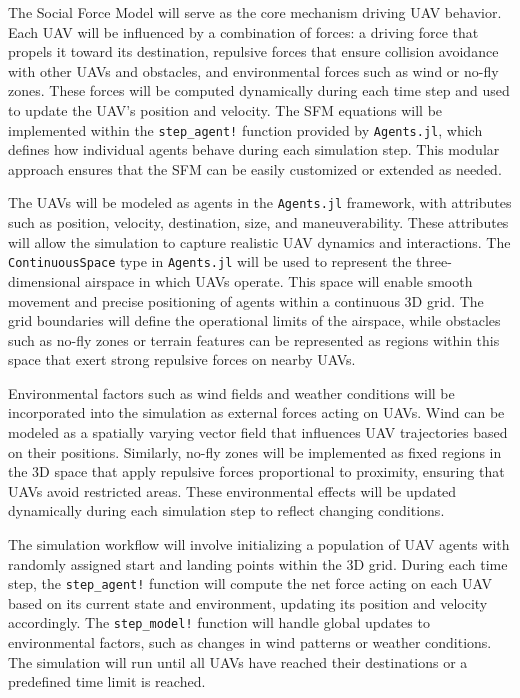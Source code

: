 \documentclass[letterpaper,11pt]{article}
\begin{document}
The Social Force Model will serve as the core mechanism driving UAV behavior. Each UAV will be influenced by a combination of forces: a driving force that propels it toward its destination, repulsive forces that ensure collision avoidance with other UAVs and obstacles, and environmental forces such as wind or no-fly zones. These forces will be computed dynamically during each time step and used to update the UAV's position and velocity. The SFM equations will be implemented within the \texttt{step\_agent!} function provided by \texttt{Agents.jl}, which defines how individual agents behave during each simulation step. This modular approach ensures that the SFM can be easily customized or extended as needed.

The UAVs will be modeled as agents in the \texttt{Agents.jl} framework, with attributes such as position, velocity, destination, size, and maneuverability. These attributes will allow the simulation to capture realistic UAV dynamics and interactions. The \texttt{ContinuousSpace} type in \texttt{Agents.jl} will be used to represent the three-dimensional airspace in which UAVs operate. This space will enable smooth movement and precise positioning of agents within a continuous 3D grid. The grid boundaries will define the operational limits of the airspace, while obstacles such as no-fly zones or terrain features can be represented as regions within this space that exert strong repulsive forces on nearby UAVs.

Environmental factors such as wind fields and weather conditions will be incorporated into the simulation as external forces acting on UAVs. Wind can be modeled as a spatially varying vector field that influences UAV trajectories based on their positions. Similarly, no-fly zones will be implemented as fixed regions in the 3D space that apply repulsive forces proportional to proximity, ensuring that UAVs avoid restricted areas. These environmental effects will be updated dynamically during each simulation step to reflect changing conditions.

The simulation workflow will involve initializing a population of UAV agents with randomly assigned start and landing points within the 3D grid. During each time step, the \texttt{step\_agent!} function will compute the net force acting on each UAV based on its current state and environment, updating its position and velocity accordingly. The \texttt{step\_model!} function will handle global updates to environmental factors, such as changes in wind patterns or weather conditions. The simulation will run until all UAVs have reached their destinations or a predefined time limit is reached.
\end{document}
